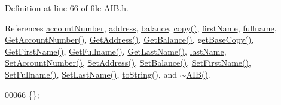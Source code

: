 Definition at line \hyperlink{_a_i_b_8h_source_l00066}{66} of file \hyperlink{_a_i_b_8h_source}{A\+I\+B.\+h}.



References \hyperlink{_a_i_b_8h_source_l00099}{account\+Number}, \hyperlink{_a_i_b_8h_source_l00101}{address}, \hyperlink{_a_i_b_8h_source_l00100}{balance}, \hyperlink{_a_i_b_8cpp_source_l00037}{copy()}, \hyperlink{_a_i_b_8h_source_l00097}{first\+Name}, \hyperlink{_a_i_b_8h_source_l00096}{fullname}, \hyperlink{_a_i_b_8cpp_source_l00075}{Get\+Account\+Number()}, \hyperlink{_a_i_b_8cpp_source_l00059}{Get\+Address()}, \hyperlink{_a_i_b_8cpp_source_l00067}{Get\+Balance()}, \hyperlink{_a_i_b_8cpp_source_l00024}{get\+Base\+Copy()}, \hyperlink{_a_i_b_8cpp_source_l00091}{Get\+First\+Name()}, \hyperlink{_a_i_b_8cpp_source_l00099}{Get\+Fullname()}, \hyperlink{_a_i_b_8cpp_source_l00083}{Get\+Last\+Name()}, \hyperlink{_a_i_b_8h_source_l00098}{last\+Name}, \hyperlink{_a_i_b_8cpp_source_l00071}{Set\+Account\+Number()}, \hyperlink{_a_i_b_8cpp_source_l00055}{Set\+Address()}, \hyperlink{_a_i_b_8cpp_source_l00063}{Set\+Balance()}, \hyperlink{_a_i_b_8cpp_source_l00087}{Set\+First\+Name()}, \hyperlink{_a_i_b_8cpp_source_l00095}{Set\+Fullname()}, \hyperlink{_a_i_b_8cpp_source_l00079}{Set\+Last\+Name()}, \hyperlink{_a_i_b_8cpp_source_l00050}{to\+String()}, and \hyperlink{_a_i_b_8cpp_source_l00017}{$\sim$\+A\+I\+B()}.


\begin{DoxyCode}
00066 \{\};
\end{DoxyCode}


